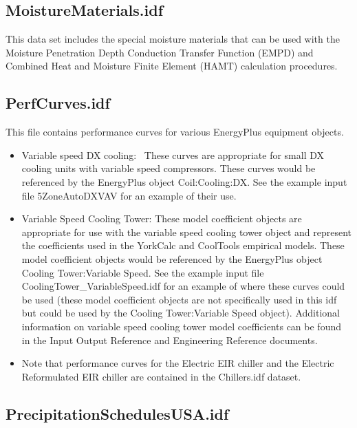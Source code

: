 \subsection{MoistureMaterials.idf}\label{moisturematerials.idf}

This data set includes the special moisture materials that can be used with the Moisture Penetration Depth Conduction Transfer Function (EMPD) and Combined Heat and Moisture Finite Element (HAMT) calculation procedures.

\subsection{PerfCurves.idf}\label{perfcurves.idf}

This file contains performance curves for various EnergyPlus equipment objects.

\begin{itemize}
\item
  Variable speed DX cooling:~ These curves are appropriate for small DX cooling units with variable speed compressors. These curves would be referenced by the EnergyPlus object Coil:Cooling:DX. See the example input file 5ZoneAutoDXVAV for an example of their use.
\item
  Variable Speed Cooling Tower: These model coefficient objects are appropriate for use with the variable speed cooling tower object and represent the coefficients used in the YorkCalc and CoolTools empirical models. These model coefficient objects would be referenced by the EnergyPlus object Cooling Tower:Variable Speed. See the example input file CoolingTower\_VariableSpeed.idf for an example of where these curves could be used (these model coefficient objects are not specifically used in this idf but could be used by the Cooling Tower:Variable Speed object). Additional information on variable speed cooling tower model coefficients can be found in the Input Output Reference and Engineering Reference documents.
\item
  Note that performance curves for the Electric EIR chiller and the Electric Reformulated EIR chiller are contained in the Chillers.idf dataset.
\end{itemize}

\subsection{PrecipitationSchedulesUSA.idf}\label{precipitationschedulesusa.idf}


